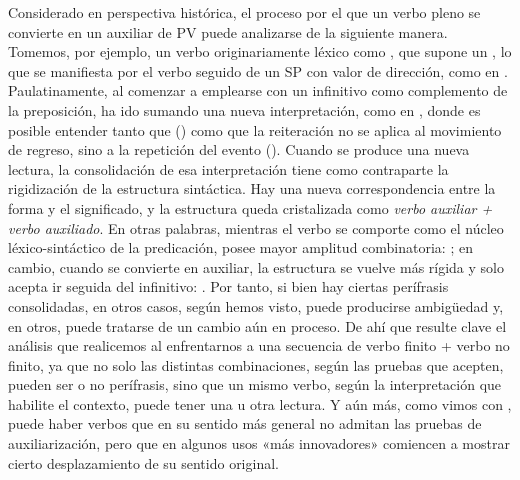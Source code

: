 \begin{recuadro}
Considerado en perspectiva histórica, el proceso por el que un verbo pleno se
convierte en un auxiliar de PV puede analizarse de la siguiente manera. Tomemos,
por ejemplo, un verbo originariamente léxico como , que supone un
, lo que se manifiesta por el
verbo seguido de un SP con valor de dirección, como en . Paulatinamente, al comenzar a emplearse con un infinitivo como
complemento de la preposición, ha ido sumando una nueva interpretación, como en
, donde es posible entender tanto que
() como que la reiteración
no se aplica al movimiento de regreso, sino a la repetición del evento
(). Cuando se produce una nueva lectura, la
consolidación de esa interpretación tiene como contraparte la rigidización de la
estructura sintáctica. Hay una nueva correspondencia entre la forma y el
significado, y la estructura queda cristalizada como \textit{verbo auxiliar +
verbo auxiliado}. En otras palabras, mientras el verbo se comporte como el núcleo
léxico-sintáctico de la predicación, posee mayor amplitud combinatoria:
; en cambio,
cuando se convierte en auxiliar, la estructura se vuelve más rígida y solo acepta
ir seguida del infinitivo: . Por tanto, si bien hay ciertas perífrasis consolidadas, en otros
casos, según hemos visto, puede producirse ambigüedad y, en otros, puede tratarse
de un cambio aún en proceso. De ahí que resulte clave el análisis que realicemos
al enfrentarnos a una secuencia de verbo finito + verbo no finito, ya que no solo
las distintas combinaciones, según las pruebas que acepten, pueden ser o no
perífrasis, sino que un mismo verbo, según la interpretación que habilite el
contexto, puede tener una u otra lectura. Y aún más, como vimos con
, puede haber verbos que en su sentido más general no admitan las
pruebas de auxiliarización, pero que en algunos usos «más innovadores» comiencen
a mostrar cierto desplazamiento de su sentido original.
\end{recuadro}

